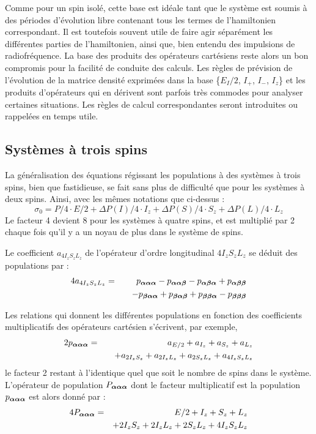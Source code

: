 Comme pour un spin isolé, cette base est idéale tant que le système est soumis
à des périodes d'évolution libre contenant tous les termes de
l'hamiltonien correspondant.
Il est toutefois souvent utile de faire agir séparément les différentes
parties de l'hamiltonien, ainsi que, bien entendu des impulsions de radiofréquence.
La base des produits des opérateurs cartésiens reste alors un bon compromis
pour la facilité de conduite des calculs.
Les règles de prévision de l'évolution de la matrice densité exprimées dans la
base \{$E_I/2$, $I_+$, $I_-$, $I_z$\} et les produits d'opérateurs qui en dérivent
sont parfois très commodes pour analyser certaines situations.
Les règles de calcul correspondantes seront introduites ou rappelées en temps utile.

\subsection{Systèmes à trois spins}

La généralisation des équations régissant les populations à des systèmes à trois spins,
bien que fastidieuse, se fait sans plus de difficulté que pour les systèmes à deux spins.
Ainsi, avec les mêmes notations que ci-dessus :
\begin{equation}
\sigma_0 = P/4 \cdot E/2 + \Delta P(I)/4 \cdot I_z + 
\Delta P(S)/4 \cdot S_z + \Delta P(L)/4 \cdot L_z
\end{equation}
Le facteur 4 devient 8 pour les systèmes à quatre spins, 
et est multiplié par 2 chaque fois qu'il y a un noyau de plus dans le système de spins.

Le coefficient $a_{4I_zS_zL_z}$ de l'opérateur d'ordre longitudinal $4I_zS_zL_z$
se déduit des populations par :
\begin{eqnarray}
4a_{4I_zS_zL_z} & = & p_{\boldsymbol{\alpha}\boldsymbol{\alpha}\boldsymbol{\alpha}} - p_{\boldsymbol{\alpha}\boldsymbol{\alpha}\boldsymbol{\beta}} - p_{\boldsymbol{\alpha}\boldsymbol{\beta}\boldsymbol{\alpha}} + p_{\boldsymbol{\alpha}\boldsymbol{\beta}\boldsymbol{\beta}}
\nonumber\\
& & \quad - p_{\boldsymbol{\beta}\boldsymbol{\alpha}\boldsymbol{\alpha}} + p_{\boldsymbol{\beta}\boldsymbol{\alpha}\boldsymbol{\beta}} + p_{\boldsymbol{\beta}\boldsymbol{\beta}\boldsymbol{\alpha}} - p_{\boldsymbol{\beta}\boldsymbol{\beta}\boldsymbol{\beta}}
\end{eqnarray}

Les relations qui donnent les différentes populations en fonction des coefficients
multiplicatifs des opérateurs cartésien s'écrivent, par exemple, 
\begin{eqnarray}
2p_{\boldsymbol{\alpha}\boldsymbol{\alpha}\boldsymbol{\alpha}} & = & a_{E/2} + a_{I_z} + a_{S_z} + a_{L_z}
\nonumber\\
& & \quad + a_{2I_zS_z} + a_{2I_zL_z} + a_{2S_zL_z} + a_{4I_zS_zL_z}
\end{eqnarray}
le facteur 2 restant à l'identique quel que soit le nombre de spins dans le système.
L'opérateur de population $P_{\boldsymbol{\alpha}\boldsymbol{\alpha}\boldsymbol{\alpha}}$ dont le facteur multiplicatif est 
la population $p_{\boldsymbol{\alpha}\boldsymbol{\alpha}\boldsymbol{\alpha}}$ est alors donné par :
\begin{eqnarray}
4P_{\boldsymbol{\alpha}\boldsymbol{\alpha}\boldsymbol{\alpha}} & = & E/2 + I_z + S_z + L_z
\nonumber\\
& & + 2I_zS_z + 2I_zL_z + 2S_zL_z + 4I_zS_zL_z
\end{eqnarray}

